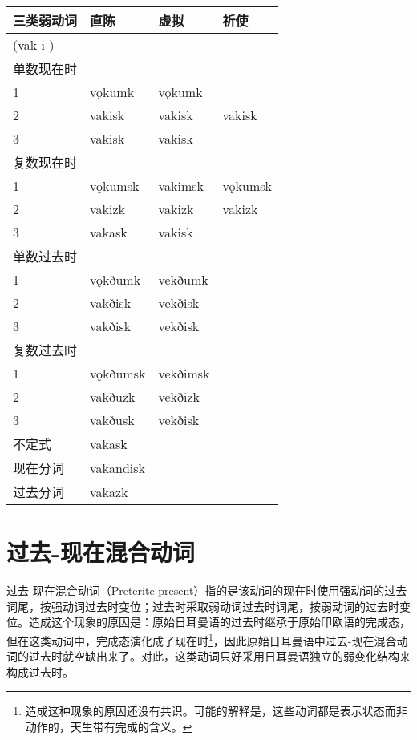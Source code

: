\begin{longtable}{llll}
    \toprule
    三类弱动词 & 直陈      & 虚拟     & 祈使    \\
    \midrule
    \endhead
    \bottomrule
    \endfoot
    (vak-i-)   &           &          &         \\
    单数现在时 &           &          &         \\
    1          & vǫkumk    & vǫkumk   &         \\
    2          & vakisk    & vakisk   & vakisk  \\
    3          & vakisk    & vakisk   &         \\
    复数现在时 &           &          &         \\
    1          & vǫkumsk   & vakimsk  & vǫkumsk \\
    2          & vakizk    & vakizk   & vakizk  \\
    3          & vakask    & vakisk   &         \\
    单数过去时 &           &          &         \\
    1          & vǫkðumk   & vekðumk  &         \\
    2          & vakðisk   & vekðisk  &         \\
    3          & vakðisk   & vekðisk  &         \\
    复数过去时 &           &          &         \\
    1          & vǫkðumsk  & vekðimsk &         \\
    2          & vakðuzk   & vekðizk  &         \\
    3          & vakðusk   & vekðisk  &         \\
    不定式     & vakask    &          &         \\
    现在分词   & vakandisk &          &         \\
    过去分词   & vakazk    &          &         \\
\end{longtable}

\section{过去-现在混合动词}\label{过去-现在混合动词}

过去-现在混合动词（Preterite-present）指的是该动词的现在时使用强动词的过去词尾，按强动词过去时变位；过去时采取弱动词过去时词尾，按弱动词的过去时变位。造成这个现象的原因是：原始日耳曼语的过去时继承于原始印欧语的完成态，但在这类动词中，完成态演化成了现在时\footnote{造成这种现象的原因还没有共识。可能的解释是，这些动词都是表示状态而非动作的，天生带有完成的含义。}，因此原始日耳曼语中过去-现在混合动词的过去时就空缺出来了。对此，这类动词只好采用日耳曼语独立的弱变化结构来构成过去时。

